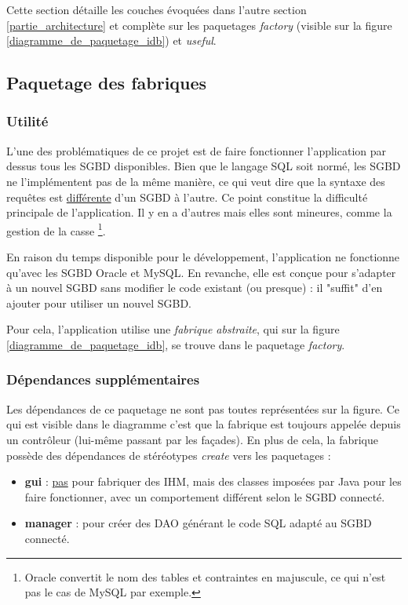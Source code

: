 Cette section détaille les couches évoquées dans l'autre section \ref{partie_architecture} et complète sur les paquetages \textit{factory} (visible sur la figure \ref{diagramme_de_paquetage_idb}) et \textit{useful}.

\subsection{Paquetage des fabriques}
\subsubsection{Utilité}
L'une des problématiques de ce projet est de faire fonctionner l'application par dessus tous les SGBD disponibles.
Bien que le langage SQL soit normé, les SGBD ne l'implémentent pas de la même manière, ce qui veut dire que la syntaxe des requêtes est \underline{différente} d'un SGBD à l'autre.
Ce point constitue la difficulté principale de l'application.
Il y en a d'autres mais elles sont mineures, comme la gestion de la casse
\footnote{\label{casse_et_sgbd}Oracle convertit le nom des tables et contraintes en majuscule, ce qui n'est pas le cas de MySQL par exemple.}.

En raison du temps disponible pour le développement, l'application ne fonctionne qu'avec les SGBD Oracle et MySQL.
En revanche, elle est conçue pour s'adapter à un nouvel SGBD sans modifier le code existant (ou presque) : il "suffit" d'en ajouter pour utiliser un nouvel SGBD.

Pour cela, l'application utilise une \textit{fabrique abstraite}, qui sur la figure \ref{diagramme_de_paquetage_idb}, se trouve dans le paquetage \textit{factory}.

\subsubsection{Dépendances supplémentaires}
Les dépendances de ce paquetage ne sont pas toutes représentées sur la figure.
Ce qui est visible dans le diagramme c'est que la fabrique est toujours appelée depuis un contrôleur (lui-même passant par les façades).
En plus de cela, la fabrique possède des dépendances de stéréotypes \textit{create} vers les paquetages :
\begin{itemize}
\item \textbf{gui} : \underline{pas} pour fabriquer des IHM, mais des classes imposées par Java pour les faire fonctionner, avec un comportement différent selon le SGBD connecté.
\item \textbf{manager} : pour créer des DAO générant le code SQL adapté au SGBD connecté.
\end{itemize}

